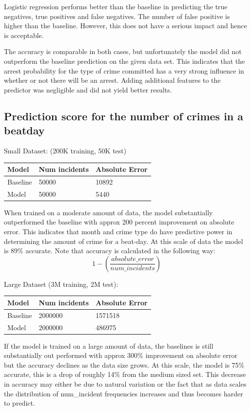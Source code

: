\documentclass[journal]{IEEEtran}
\begin{document}
Logistic regression performs better than the baseline in predicting the true negatives, true positives and false negatives.  The number of false positive is  higher than the baseline.  However, this does not have a serious impact and hence is acceptable.

The accuracy is comparable in both cases, but unfortunately the model did not outperform the baseline prediction on the given data set. This indicates that the arrest probability for the type of crime committed has a very strong influence in whether or not there will be an arrest. Adding additional features to the predictor was negligible and did not yield better results.

\subsection{Prediction score for the number of crimes in a beat\-day}
Small Dataset: (200K training, 50K test)
\begin{center}
\begin{tabular}{| l | l | l |}\hline
Model & Num incidents & Absolute Error\\ \hline
Baseline & 50000 & 10892\\ \hline
Model & 50000 & 5440\\ \hline
\end{tabular}
\end{center}

When trained on a moderate amount of data, the model substantially outperformed the baseline with approx 200 percent improvement on absolute error. This indicates that month and crime type do have predictive power in determining the amount of crime for a beat-day. At this scale of data the model is 89\% accurate. Note that accuracy is calculated in the following way: 
$$ 1 - (\frac{absolute\_error}{num\_incidents}) $$


Large Dataset (3M training, 2M test):
\begin{center}
\begin{tabular}{| l | l | l |}\hline
Model & Num incidents & Absolute Error\\ \hline
Baseline & 2000000 & 1571518\\ \hline
Model & 2000000 & 486975\\ \hline
\end{tabular}
\end{center}

If the model is trained on a large amount of data, the baselines is still substantially out performed with approx 300\% improvement on absolute error but the accuracy declines as the data size grows. 
At this scale, the model is 75\% accurate, this is a drop of roughly 14\% from the medium sized set. This decrease in accuracy may either be due to natural variation or the fact that as data scales the distribution of num\_incident frequencies increases and thus becomes harder to predict.
\end{document}
